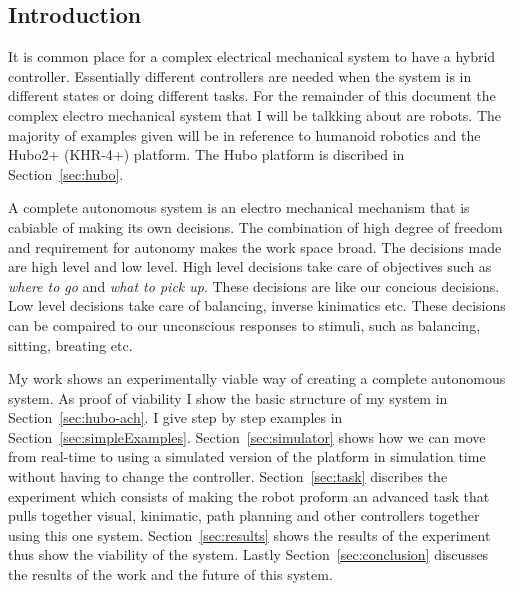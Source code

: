 \subsection{Introduction}



It is common place for a complex electrical mechanical system to have a hybrid controller.  
Essentially different controllers are needed when the system is in different states or doing different tasks.
For the remainder of this document the complex electro mechanical system that I will be talkking about are robots.
The majority of examples given will be in reference to humanoid robotics and the Hubo2+ (KHR-4+) platform.
The Hubo platform is discribed in Section~\ref{sec:hubo}.

A complete autonomous system is an electro mechanical mechanism that is cabiable of making its own decisions.
The combination of high degree of freedom and requirement for autonomy makes the work space broad.
The decisions made are high level and low level.
High level decisions take care of objectives such as \textit{where to go} and \textit{what to pick up}. 
These decisions are like our concious decisions.
Low level decisions take care of balancing, inverse kinimatics etc.
These decisions can be compaired to our unconscious responses to stimuli, such as balancing, sitting, breating etc.

My work shows an experimentally viable way of creating a complete autonomous system.  
As proof of viability I show the basic structure of my system in Section~\ref{sec:hubo-ach}.  
I give step by step examples in Section~\ref{sec:simpleExamples}.
Section~\ref{sec:simulator} shows how we can move from real-time to using a simulated version of the platform in simulation time without having to change the controller.
Section~\ref{sec:task} discribes the experiment which consists of making the robot proform an advanced task that pulls together visual, kinimatic, path planning and other controllers together using this one system.
Section~\ref{sec:results} shows the results of the experiment thus show the viability of the system.
Lastly Section~\ref{sec:conclusion} discusses the results of the work and the future of this system.


